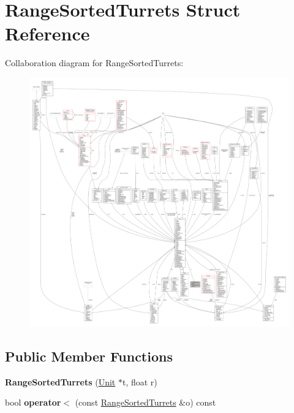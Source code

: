 \hypertarget{structRangeSortedTurrets}{}\section{Range\+Sorted\+Turrets Struct Reference}
\label{structRangeSortedTurrets}


Collaboration diagram for Range\+Sorted\+Turrets\+:
\nopagebreak
\begin{figure}[H]
\begin{center}
\leavevmode
\includegraphics[width=350pt]{dd/dc9/structRangeSortedTurrets__coll__graph}
\end{center}
\end{figure}
\subsection*{Public Member Functions}
\begin{DoxyCompactItemize}
\item 
{\bfseries Range\+Sorted\+Turrets} (\hyperlink{classUnit}{Unit} $\ast$t, float r)\hypertarget{structRangeSortedTurrets_a550e473ef3f496ac82214f4ebee18181}{}\label{structRangeSortedTurrets_a550e473ef3f496ac82214f4ebee18181}

\item 
bool {\bfseries operator$<$} (const \hyperlink{structRangeSortedTurrets}{Range\+Sorted\+Turrets} \&o) const \hypertarget{structRangeSortedTurrets_a8254540d470f06082c43871dd6e0a24b}{}\label{structRangeSortedTurrets_a8254540d470f06082c43871dd6e0a24b}

\end{DoxyCompactItemize}
